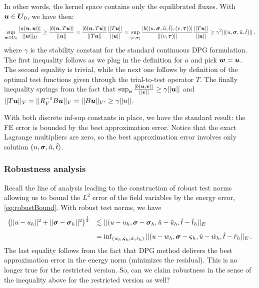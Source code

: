 \documentclass[Proposal.tex]{subfiles}
\begin{document}
In other words, the kernel space contains only the equilibrated fluxes.
With $\boldsymbol u \in \boldsymbol U_0$, we have then:
\begin{equation}
   \sup_{\boldsymbol w \in \boldsymbol U_0} \frac{| a(\boldsymbol u,\boldsymbol w) |}{|| \boldsymbol w ||_{\boldsymbol U} }
   \geq \frac{| b(\boldsymbol u,T \boldsymbol u) |}{|| \boldsymbol u ||}
   = \frac{| b(\boldsymbol u,T \boldsymbol u) |}{|| T\boldsymbol u ||}\frac{||T\boldsymbol u||}{||\boldsymbol u||}
   = \sup_{(v,\boldsymbol\tau)}\frac{| b((u,\boldsymbol\sigma,\hat{u},\hat{t}), (v,\boldsymbol\tau)) |}{|| (v,\boldsymbol\tau) ||}
   \frac{||T\boldsymbol u||}{||\boldsymbol u||}
   \geq \gamma^2 || (u,\boldsymbol\sigma,\hat{u},\hat{t}) ||\,,
\end{equation}
where $\gamma$ is the stability constant for the standard continuous DPG formulation.
The first inequality follows as we plug in the definition for $a$ and pick
$\boldsymbol w=\boldsymbol u$. The second equality is trivial, while the next one follows by definition of the optimal test
functions given through the trial-to-test operator $T$. The finally inequality
springs from the fact that
$\sup_{\boldsymbol v}\frac{|b(\boldsymbol u,\boldsymbol v)|}{||\boldsymbol v||}\geq\gamma||\boldsymbol u||$ and
$||T\boldsymbol u||_V=||R_V^{-1}B\boldsymbol u||_V=||B\boldsymbol u||_{V'}\geq\gamma||u||$.

With both discrete inf-sup constants in place, we have the standard result: the FE error
is bounded by the best approximation error. Notice that the exact Lagrange multipliers
are zero, so the best approximation error involves only solution $(u,\boldsymbol\sigma,\hat{u},\hat{t})$.

\subsubsection{Robustness analysis}
\label{sec:robustnessAnalysis}

Recall the line of analysis leading to the construction of robust
test norms allowing us to bound the $L^2$ error of the field variables by the
energy error, \eqref{eq:robustBound}. With robust test norms, we have
\begin{equation}
\begin{array}{ll}
   \left( || u - u_h ||^2+ || \boldsymbol\sigma - \boldsymbol\sigma_h ||^2 \right)^{\frac{1}{2}}
& \lesssim || (u - u_h, \boldsymbol\sigma - \boldsymbol\sigma_h, \hat{u} - \hat{u}_h, \hat{t} - \hat{t}_h ||_E \\[8pt]
&= \inf_{(w_h,\boldsymbol\varsigma_h,\hat{w},\hat{r}_h)}
|| (u - w_h, \boldsymbol\sigma - \boldsymbol\varsigma_h, \hat{u} - \hat{w}_h, \hat{t} - \hat{r}_h ||_E\,.
\end{array}
\end{equation}
The last equality follows from the fact that DPG method delivers the best approximation
error in the energy norm (minimizes the residual). This is no longer true for the
restricted version. So, can we claim robustness in the sense of the inequality above
for the restricted version as well?
\end{document}
